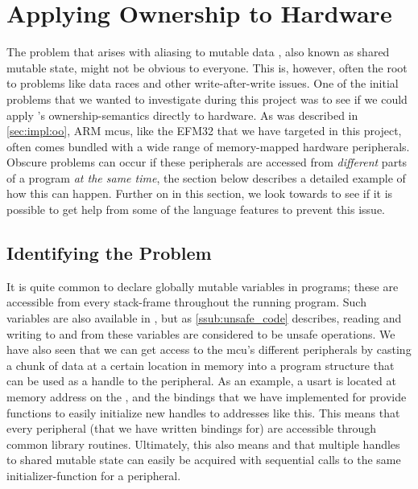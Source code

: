 
\section{Applying Ownership to Hardware}
\label{sec:ownership_allied_to_hardware}

The problem that arises with aliasing to mutable data \cite{web:problem_with_shared_mutability}, also known as shared mutable state, might not be obvious to everyone.
This is, however, often the root to problems like data races and other write-after-write issues.
One of the initial problems that we wanted to investigate during this project was to see if we could apply {\rust}'s ownership-semantics directly to hardware.
As was described in \autoref{sec:impl:oo}, ARM \glspl{mcu}, like the EFM32 that we have targeted in this project, often comes bundled with a wide range of memory-mapped hardware peripherals.
Obscure problems can occur if these peripherals are accessed from \emph{different} parts of a program \emph{at the same time}, the section below describes a detailed example of how this can happen.
Further on in this section, we look towards {\rust} to see if it is possible to get help from some of the language features to prevent this issue.

\subsection{Identifying the Problem}

It is quite common to declare globally mutable variables in {\C} programs; these are accessible from every stack-frame throughout the running program.
Such variables are also available in {\rust}, but as \autoref{ssub:unsafe_code} describes, reading and writing to and from these variables are considered to be unsafe operations.
We have also seen that we can get access to the \gls{mcu}'s different peripherals by casting a chunk of data at a certain location in memory into a program structure that can be used as a handle to the peripheral.
As an example, a \gls{usart} is located at memory address  on the {\gecko}, and the bindings that we have implemented for {\emlib} provide functions to easily initialize new handles to addresses like this.
This means that every peripheral (that we have written bindings for) are accessible through common library routines.
Ultimately, this also means and that multiple handles to shared mutable state can easily be acquired with sequential calls to the same initializer-function for a peripheral.

